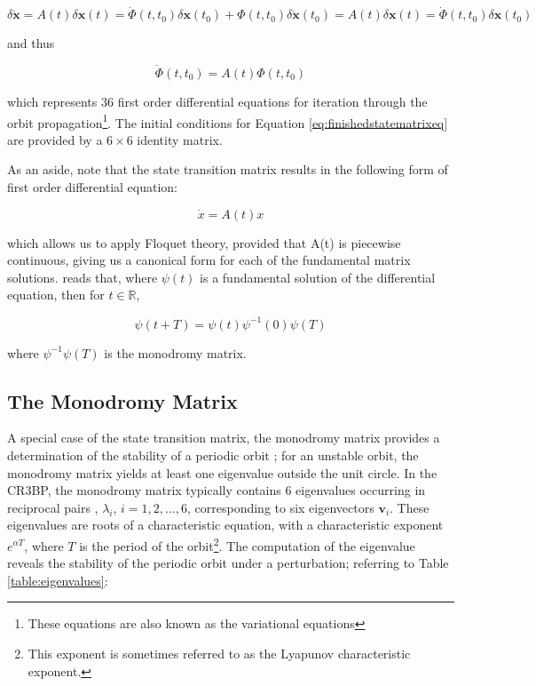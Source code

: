 \begin{equation}
\delta \pmb{\dot{x}} = A \left( t \right) \delta \pmb{x} \left( t \right) = \dot{\Phi}\left(t, t_0\right) \delta \pmb{x} \left( t_0 \right) + \Phi \left(t, t_0\right) \delta\pmb{\dot{x}}\left(t_0\right) = A \left( t \right) \delta \pmb{x} \left( t \right) = \dot{\Phi}\left(t, t_0\right) \delta \pmb{x} \left( t_0 \right)
\end{equation}

\noindent and thus

\begin{equation}\label{eq:finishedstatematrixeq}
\dot{\Phi} \left( t, t_0 \right) = A\left( t\right)\Phi(t, t_0)
\end{equation}

\noindent which represents 36 first order differential equations for iteration through the orbit propagation\footnote{These equations are also known as the variational equations}. The initial conditions for Equation \ref{eq:finishedstatematrixeq} are provided by a $6\times 6$ identity matrix.

As an aside, note that the state transition matrix results in the following form of first order differential equation:

\begin{equation}
\dot{x} = A(t) x
\end{equation}

which allows us to apply Floquet theory, provided that A(t) is piecewise continuous, giving us a canonical form for each of the fundamental matrix solutions. \citep{Floquet1883} reads that, where $\psi (t)$ is a fundamental solution of the differential equation, then for $t \in \mathbb{R}$,

\begin{equation}
\psi(t+T) = \psi(t)\psi^{-1}(0)\psi(T)
\end{equation}

where $\psi^{-1}\psi(T)$ is the monodromy matrix.

\subsection{The Monodromy Matrix}

A special case of the state transition matrix, the monodromy matrix provides a determination of the stability of a periodic orbit \citep{Russell2006}; for an unstable orbit, the monodromy matrix yields at least one eigenvalue outside the unit circle. In the CR3BP, the monodromy matrix typically contains 6 eigenvalues occurring in reciprocal pairs \citep{broucke1968}, $\lambda_i$, $i = 1, 2, ..., 6$, corresponding to six eigenvectors $\pmb{v}_i$. These eigenvalues are roots of a characteristic equation, with a characteristic exponent $e^{\alpha T}$, where $T$ is the period of the orbit\footnote{This exponent is sometimes referred to as the Lyapunov characteristic exponent.}. The computation of the eigenvalue reveals the stability of the periodic orbit under a perturbation; referring to Table \ref{table:eigenvalues}:

